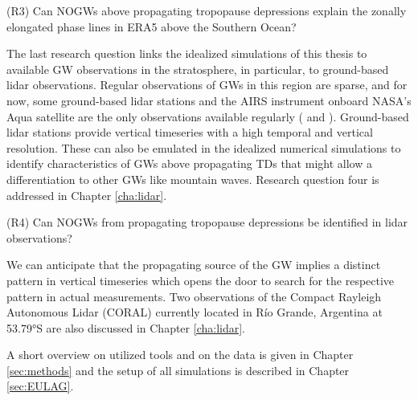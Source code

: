\begin{tcolorbox}[]
    (R3) Can NOGWs above propagating tropopause depressions explain the zonally elongated phase lines in ERA5 above the Southern Ocean?
\end{tcolorbox} 
The last research question links the idealized simulations of this thesis to available GW observations in the stratosphere, in particular, to ground-based lidar observations. Regular observations of GWs in this region are sparse, and for now, some ground-based lidar stations and the AIRS instrument onboard NASA's Aqua satellite are the only observations available regularly (\cite[]{kaifler_compact_2021} and \cite[]{hindley_18year_2020}). Ground-based lidar stations provide vertical timeseries with a high temporal and vertical resolution. These can also be emulated in the idealized numerical simulations to identify characteristics of GWs above propagating TDs that might allow a differentiation to other GWs like mountain waves. Research question four is addressed in Chapter \ref{cha:lidar}.
\begin{tcolorbox}[]
    (R4) Can NOGWs from propagating tropopause depressions be identified in lidar observations?
\end{tcolorbox}
We can anticipate that the propagating source of the GW implies a distinct pattern in vertical timeseries which opens the door to search for the respective pattern in actual measurements. Two observations of the Compact Rayleigh Autonomous Lidar (CORAL) currently located in Río Grande, Argentina at 53.79°S are also discussed in Chapter \ref{cha:lidar}.

A short overview on utilized tools and on the data is given in Chapter \ref{sec:methods} and the setup of all simulations is described in Chapter \ref{sec:EULAG}.



